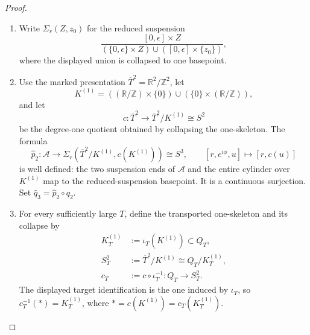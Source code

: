 \begin{proof}
\begin{enumerate}[label=\arabic*.,leftmargin=*]
\item Write \(\Sigma_r(Z,z_0)\) for the reduced suspension
\[
 \frac{[0,\epsilon]\times Z}
 {(\{0,\epsilon\}\times Z)\cup([0,\epsilon]\times\{z_0\})},
\]
where the displayed union is collapsed to one basepoint.

\item Use the marked presentation
\(\overline T^2=\mathbb R^2/\mathbb Z^2\), let
\[
 K^{(1)}=
 ((\mathbb R/\mathbb Z)\times\{0\})
 \cup(\{0\}\times(\mathbb R/\mathbb Z)),
\]
and let
\[
 c:\overline T^2\longrightarrow
 \overline T^2/K^{(1)}\cong S^2
\]
be the degree-one quotient obtained by collapsing the one-skeleton.  The
formula
\[
 \widehat p_2:\mathcal A\longrightarrow
 \Sigma_r(\overline T^2/K^{(1)},c(K^{(1)}))\cong S^3,
 \qquad
 [r,e^{i\phi},u]\longmapsto[r,c(u)]
\]
is well defined: the two suspension ends of \(\mathcal A\) and the entire
cylinder over \(K^{(1)}\) map to the reduced-suspension basepoint.  It is a
continuous surjection.  Set
\(\widehat q_3=\widehat p_2\circ q_2\).

\item For every sufficiently large \(T\), define the transported one-skeleton and
its collapse by
\begin{equation}
 \begin{aligned}
 K_T^{(1)}&:=\iota_T(K^{(1)})\subset Q_T,\\
 S_T^2&:=\overline T^2/K^{(1)}\cong Q_T/K_T^{(1)},\\
 c_T&:=c\circ\iota_T^{-1}:Q_T\longrightarrow S_T^2.
 \end{aligned}
 \label{wb:cusp-cone-transported-skeleton-collapse}
\end{equation}
The displayed target identification is the one induced by \(\iota_T\), so
\(c_T^{-1}(*)=K_T^{(1)}\), where
\(*=c(K^{(1)})=c_T(K_T^{(1)})\).


\end{enumerate}
\end{proof}
